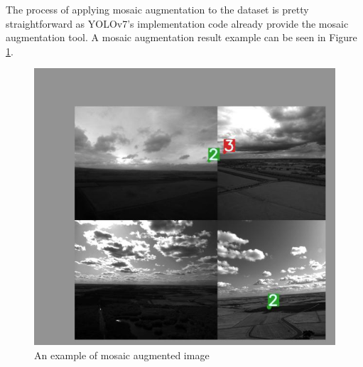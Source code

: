 The process of applying mosaic augmentation to the dataset is pretty straightforward as YOLOv7's implementation code
already provide the mosaic augmentation tool. A mosaic augmentation result example can be seen in Figure \ref{fig:mosaic-train}.
  \begin{figure}[H]
    \centering
    \includegraphics[scale=0.4]{figures/mosaic-aug-2.png}
    \caption{An example of mosaic augmented image}
    \label{fig:mosaic-train}
  \end{figure}

